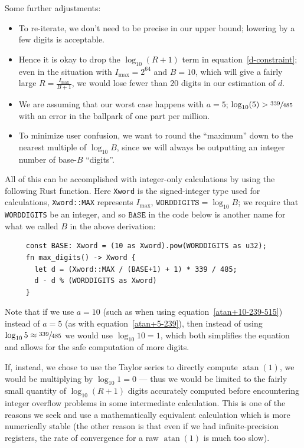 \documentclass{report}
\newcommand{\vbreak}{\vspace{4ex}}
\newcommand{\vextra}{\vspace{2ex}}
\newcommand{\Imax}{\ensuremath{I_\text{max}}}
\DeclareMathOperator{\atan}{atan}
\begin{document}
\vbreak
Some further adjustments:
\begin{itemize}
  \item To re-iterate, we don't need to be precise in our upper bound;
    lowering by a few digits is acceptable.
  \item Hence it is okay to drop the $\log_{10}(R+1)$ term
    in equation~\eqref{d-constraint};
    even in the situation with
    $\Imax = 2^{64}$ and $B=10$,
    which will give a fairly large $R=\tfrac{\Imax}{B+1}$,
    we would lose fewer than 20 digits
    in our estimation of $d$.
  \item We are assuming that our worst case happens with $a=5$;
    $\log_{10}(5) > \sfrac{339}{485}$
    with an error in the ballpark of one part per million.
  \item To minimize user confusion, we want to round the ``maximum''
    down to the nearest multiple of $\log_{10} B$,
    since we will always be outputting
    an integer number of base-$B$ ``digits''.
\end{itemize}
All of this can be accomplished with integer-only calculations
by using the following Rust function.
Here
\texttt{Xword} is the signed-integer type used for calculations,
\texttt{Xword::MAX} represents $\Imax$,
$\texttt{WORDDIGITS} = \log_{10} B$;
we require that \texttt{WORDDIGITS} be an integer,
and so $\texttt{BASE}$ in the code below
is another name for what we called $B$ in the above derivation:
\begin{verbatim}
     const BASE: Xword = (10 as Xword).pow(WORDDIGITS as u32);
     fn max_digits() -> Xword {
       let d = (Xword::MAX / (BASE+1) + 1) * 339 / 485;
       d - d % (WORDDIGITS as Xword)
     }
\end{verbatim}

\vextra
Note that if we use $a=10$
(such as when using equation~\eqref{atan+10-239-515})
instead of $a=5$
(as with equation~\eqref{atan+5-239}),
then instead of using $\log_{10}5 \approx \sfrac{339}{485}$
we would use $\log_{10} 10 = 1$,
which both simplifies the equation and allows for the safe
computation of more digits.

If, instead, we chose to use the Taylor series
to directly compute $\atan(1)$,
we would be multiplying by
$\log_{10} 1 = 0$ --- thus we would
be limited to the fairly small
quantity of $\log_{10}(R+1)$
digits accurately computed
before encountering integer overflow problems
in some intermediate calculation.
This is one of the reasons we seek and use a mathematically
equivalent calculation which is more numerically stable
(the other reason is that even if we had infinite-precision registers,
the rate of convergence for a raw $\atan(1)$ is much too slow).
\end{document}

